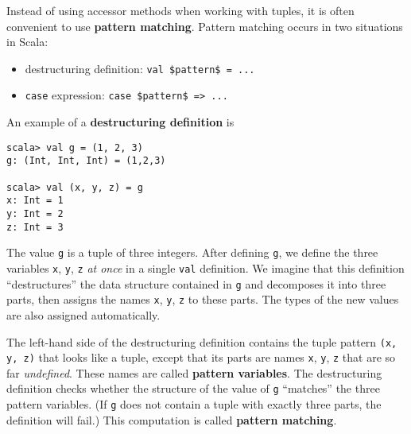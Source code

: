 Instead of using accessor methods when working with tuples, it is
often convenient to use \textbf{pattern matching}.
Pattern matching occurs in two situations in Scala:
\begin{itemize}
\item destructuring definition: \lstinline[mathescape=true]!val $pattern$ = ...!
\item {}\lstinline!case! expression:
\lstinline[mathescape=true]!case $pattern$ => ...!
\end{itemize}
An example of a \textbf{destructuring definition}
is
\begin{lstlisting}
scala> val g = (1, 2, 3)
g: (Int, Int, Int) = (1,2,3)

scala> val (x, y, z) = g
x: Int = 1
y: Int = 2
z: Int = 3
\end{lstlisting}
The value \lstinline!g!
is a tuple of three integers. After defining \lstinline!g!,
we define the three variables \lstinline!x!,
\lstinline!y!, \lstinline!z!
\emph{at once} in a single \lstinline!val!
definition. We imagine that this definition ``destructures'' the
data structure contained in \lstinline!g!
and decomposes it into three parts, then assigns the names \lstinline!x!,
\lstinline!y!, \lstinline!z!
to these parts. The types of the new values are also assigned automatically.

The left-hand side of the destructuring definition contains the tuple
pattern \lstinline!(x, y, z)!
that looks like a tuple, except that its parts are names \lstinline!x!,
\lstinline!y!, \lstinline!z!
that are so far \emph{undefined}. These names are called \textbf{pattern
variables}. The destructuring definition checks whether the structure
of the value of \lstinline!g!
``matches'' the three pattern variables.
(If \lstinline!g! does
not contain a tuple with exactly three parts, the definition will
fail.) This computation is called \textbf{pattern matching}.

